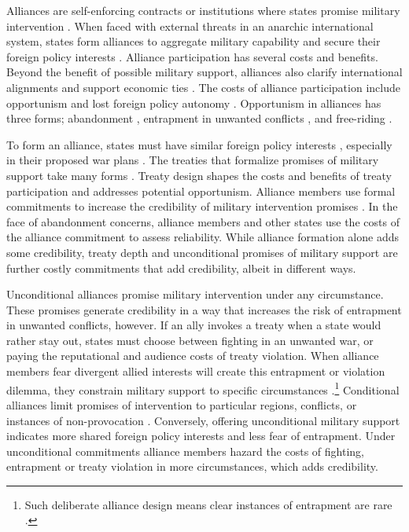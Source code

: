 \documentclass[12pt]{article}
\begin{document}
Alliances are self-enforcing contracts or institutions where states promise military intervention \citep{Leedsetal2002, Morrow2000}. 
When faced with external threats in an anarchic international system, states form alliances to aggregate military capability and secure their foreign policy interests \citep{Altfield1984, Smith1995, Snyder1997, FordhamPoast2014}.
Alliance participation has several costs and benefits.
Beyond the benefit of possible military support, alliances also clarify international alignments \citep{Snyder1990} and support economic ties \citep{Gowa1995, Li2003, Long2003, Fordham2010, WolfordKim2017}.  
The costs of alliance participation include opportunism and lost foreign policy autonomy \citep{Altfield1984, Morrow2000, Johnson2015}. 
Opportunism in alliances has three forms; abandonment \citep{Leeds2003a, BerkemeierFuhrmann2018}, entrapment in unwanted conflicts \citep{Snyder1984}, and free-riding \citep{Morrow2000}.


To form an alliance, states must have similar foreign policy interests \citep{Morrow1991, Smith1995, FordhamPoast2014}, especially in their proposed war plans \citep{Poast2019a}. 
The treaties that formalize promises of military support take many forms \citep{Leedsetal2000, Leedsetal2002, Benson2012, BensonClinton2016}. 
Treaty design shapes the costs and benefits of treaty participation and addresses potential opportunism. 
Alliance members use formal commitments to increase the credibility of military intervention promises \citep{Morrow2000}. 
In the face of abandonment concerns, alliance members and other states use the costs of the alliance commitment to assess reliability. 
While alliance formation alone adds some credibility, treaty depth and unconditional promises of military support are further costly commitments that add credibility, albeit in different ways.  


Unconditional alliances promise military intervention under any circumstance. 
These promises generate credibility in a way that increases the risk of entrapment in unwanted conflicts, however. 
If an ally invokes a treaty when a state would rather stay out, states must choose between fighting in an unwanted war, or paying the reputational \citep{Gibler2008, Crescenzietal2012} and audience \citep{Fearon1997} costs of treaty violation.
When alliance members fear divergent allied interests will create this entrapment or violation dilemma, they constrain military support to specific circumstances \citep{Kim2011, Benson2012}.\footnote{Such deliberate alliance design means clear instances of entrapment are rare \citep{Kim2011, Beckley2015}.} 
Conditional alliances limit promises of intervention to particular regions, conflicts, or instances of non-provocation \citep{Leedsetal2000}. 
Conversely, offering unconditional military support indicates more shared foreign policy interests and less fear of entrapment.
Under unconditional commitments alliance members hazard the costs of fighting, entrapment or treaty violation in more circumstances, which adds credibility.  
\end{document}
